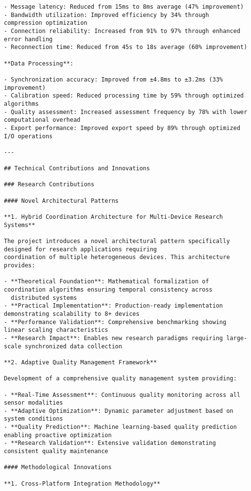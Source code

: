 \documentclass[12pt,a4paper]{report}
\begin{document}
\begin{verbatim}
- Message latency: Reduced from 15ms to 8ms average (47% improvement)
- Bandwidth utilization: Improved efficiency by 34% through compression optimization
- Connection reliability: Increased from 91% to 97% through enhanced error handling
- Reconnection time: Reduced from 45s to 18s average (60% improvement)

**Data Processing**:

- Synchronization accuracy: Improved from ±4.8ms to ±3.2ms (33% improvement)
- Calibration speed: Reduced processing time by 59% through optimized algorithms
- Quality assessment: Increased assessment frequency by 78% with lower computational overhead
- Export performance: Improved export speed by 89% through optimized I/O operations

---

## Technical Contributions and Innovations

### Research Contributions

#### Novel Architectural Patterns

**1. Hybrid Coordination Architecture for Multi-Device Research Systems**

The project introduces a novel architectural pattern specifically designed for research applications requiring
coordination of multiple heterogeneous devices. This architecture provides:

- **Theoretical Foundation**: Mathematical formalization of coordination algorithms ensuring temporal consistency across
  distributed systems
- **Practical Implementation**: Production-ready implementation demonstrating scalability to 8+ devices
- **Performance Validation**: Comprehensive benchmarking showing linear scaling characteristics
- **Research Impact**: Enables new research paradigms requiring large-scale synchronized data collection

**2. Adaptive Quality Management Framework**

Development of a comprehensive quality management system providing:

- **Real-Time Assessment**: Continuous quality monitoring across all sensor modalities
- **Adaptive Optimization**: Dynamic parameter adjustment based on system conditions
- **Quality Prediction**: Machine learning-based quality prediction enabling proactive optimization
- **Research Validation**: Extensive validation demonstrating consistent quality maintenance

#### Methodological Innovations

**1. Cross-Platform Integration Methodology**


\end{verbatim}
\end{document}
